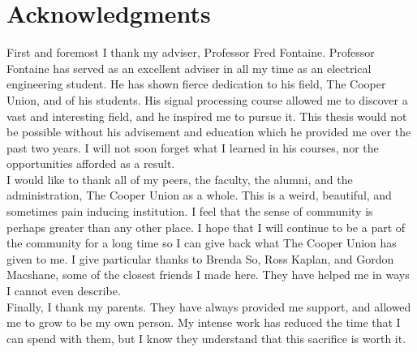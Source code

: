 {
\centering
\section*{Acknowledgments}
}
\doublespacing
\noindent
First and foremost I thank my adviser, Professor Fred Fontaine.  Professor Fontaine has served as an excellent adviser in all my time as an electrical engineering student.  He has shown fierce dedication to his field, The Cooper Union, and of his students.  His signal processing course allowed me to discover a vast and interesting field, and he inspired me to pursue it.  This thesis would not be possible without his advisement and education which he provided me over the past two years.  I will not soon forget what I learned in his courses, nor the opportunities afforded as a result. \\

\noindent
I would like to thank all of my peers, the faculty, the alumni, and the administration, The Cooper Union as a whole.  This is a weird, beautiful, and sometimes pain inducing institution.  I feel that the sense of community is perhaps greater than any other place.  I hope that I will continue to be a part of the community for a long time so I can give back what The Cooper Union has given to me.  I give particular thanks to Brenda So, Ross Kaplan, and Gordon Macshane, some of the closest friends I made here.  They have helped me in ways I cannot even describe.\\

\noindent
Finally, I thank my parents.  They have always provided me support, and allowed me to grow to be my own person.  My intense work has reduced the time that I can spend with them, but I know they understand that this sacrifice is worth it. 
